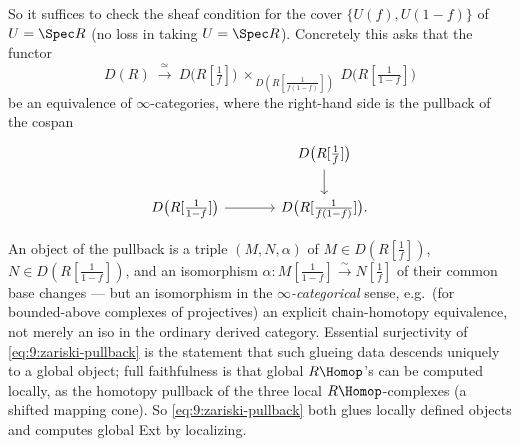 So it suffices to check the sheaf condition for the cover $\{U(f),U(1-f)\}$ of
$U=\Spec R$ (no loss in taking $U=\Spec R$). Concretely this asks that the
functor
\begin{equation}
\label{eq:9:zariski-pullback}
D(R)\ \xrightarrow{\ \simeq\ }\ D\bigl(R[\tfrac1f]\bigr)\ \times_{\,D(R[\frac1{
f(1-f)}])}\ D\bigl(R[\tfrac1{1-f}]\bigr)
\end{equation}
be an equivalence of $\infty$-categories, where the right-hand side is the
pullback of the cospan
\begin{equation*}
\begin{tikzcd}[column sep=large]
& D\bigl(R[\tfrac1f]\bigr) \arrow[d] \\
D\bigl(R[\tfrac1{1-f}]\bigr) \arrow[r] & D\bigl(R[\tfrac1{f(1-f)}]\bigr).
\end{tikzcd}
\end{equation*}

\begin{remark}
\label{rmk:9:pullback-concrete}
An object of the pullback is a triple $(M,N,\alpha)$ of $M\in D(R[\tfrac1f])$,
$N\in D(R[\tfrac1{1-f}])$, and an isomorphism $\alpha\colon M[\tfrac1{1-f}]
\xrightarrow{\sim}N[\tfrac1f]$ of their common base changes --- but an
isomorphism in the \emph{$\infty$-categorical} sense, e.g.\ (for bounded-above
complexes of projectives) an explicit chain-homotopy equivalence, not merely an
iso in the ordinary derived category. Essential surjectivity of
\eqref{eq:9:zariski-pullback} is the statement that such glueing data descends
uniquely to a global object; full faithfulness is that global $R\Homop$'s can be
computed locally, as the homotopy pullback of the three local $R\Homop$-complexes
(a shifted mapping cone). So \eqref{eq:9:zariski-pullback} both glues locally
defined objects and computes global Ext by localizing.
\end{remark}

